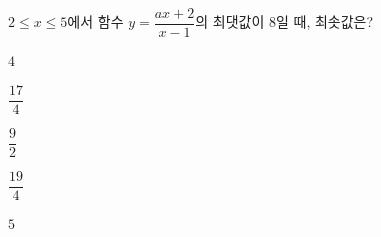 $2\le x\le 5$에서 함수 $y=\dfrac{ax+2}{x-1}$의 최댓값이 $8$일 때, 최솟값은? 
\begin{choices32}{\rule[-3ex]{0pt}{8ex}$4$}{\rule[-3ex]{0pt}{8ex}$\dfrac{17}{4}$}{\rule[-3ex]{0pt}{8ex}$\dfrac{9}{2}$}{\rule[-3ex]{0pt}{8ex}$\dfrac{19}{4}$}{\rule[-3ex]{0pt}{8ex}$5$}\end{choices32}

